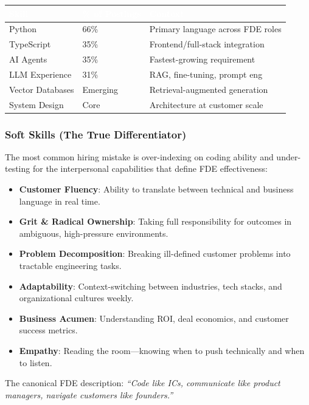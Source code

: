 \begin{center}
\begin{tabular}{L{4cm}C{3cm}L{5cm}}
\toprule
{}
\textcolor{white}{\textbf{Skill}} &
\textcolor{white}{\textbf{\% of Postings}} &
\textcolor{white}{\textbf{Context}} \\
\midrule
Python & 66\% & Primary language across FDE roles \\
TypeScript & 35\% & Frontend/full-stack integration \\
AI Agents & 35\% & Fastest-growing requirement \\
LLM Experience & 31\% & RAG, fine-tuning, prompt eng \\
Vector Databases & Emerging & Retrieval-augmented generation \\
System Design & Core & Architecture at customer scale \\
\bottomrule
\end{tabular}
\end{center}

\subsubsection{Soft Skills (The True Differentiator)}

The most common hiring mistake is over-indexing on coding ability and
under-testing for the interpersonal capabilities that define FDE
effectiveness:

\begin{itemize}
    \item \textbf{Customer Fluency}: Ability to translate between
        technical and business language in real time.
    \item \textbf{Grit \& Radical Ownership}: Taking full responsibility
        for outcomes in ambiguous, high-pressure environments.
    \item \textbf{Problem Decomposition}: Breaking ill-defined customer
        problems into tractable engineering tasks.
    \item \textbf{Adaptability}: Context-switching between industries,
        tech stacks, and organizational cultures weekly.
    \item \textbf{Business Acumen}: Understanding ROI, deal economics,
        and customer success metrics.
    \item \textbf{Empathy}: Reading the room---knowing when to push
        technically and when to listen.
\end{itemize}

The canonical FDE description: \textit{``Code like ICs, communicate like
product managers, navigate customers like founders.''}

